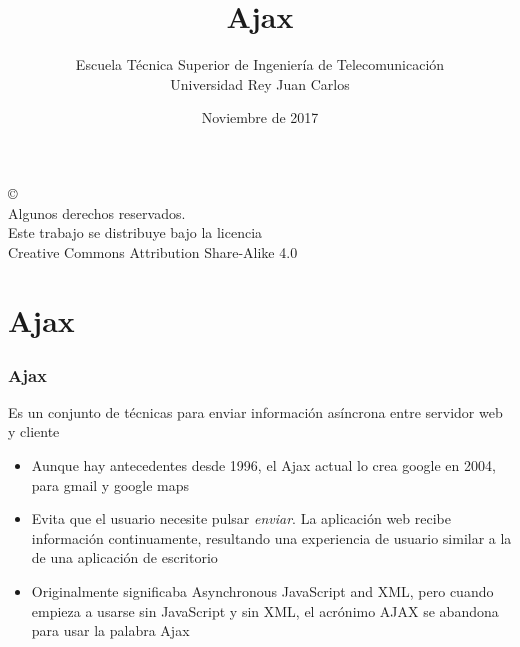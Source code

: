 \documentclass[ucs]{beamer}
\begin{document}
\title[Ajax]{Ajax}
\author[GSyC]{Escuela Técnica Superior de Ingeniería de Telecomunicación\\
Universidad Rey Juan Carlos}
\date[2017]{Noviembre de 2017}


\begin{frame}
  \titlepage
\end{frame}




\begin{frame}[b]
\begin{flushright}
{\tiny
\copyright \insertshortdate~\insertshortauthor \\
  Algunos derechos reservados. \\
  Este trabajo se distribuye bajo la licencia \\
  Creative Commons Attribution Share-Alike 4.0
}
\end{flushright}
\end{frame}



%



\section{Ajax}
\begin{frame}[fragile]
\frametitle{Ajax}

Es un conjunto de técnicas para enviar información asíncrona entre
servidor web y cliente

\begin{itemize}
\item
Aunque hay antecedentes desde 1996, el Ajax actual lo crea google en 2004, para gmail
y google maps
\item
Evita que el usuario necesite pulsar \emph{enviar}. La aplicación
web recibe información continuamente, resultando una experiencia de usuario similar
a la de una aplicación de escritorio
\item

Originalmente significaba Asynchronous JavaScript and XML, pero cuando
empieza a usarse sin JavaScript y sin XML, el acrónimo AJAX se abandona
para usar la palabra Ajax

\end{itemize}

\end{frame}
\end{document}
